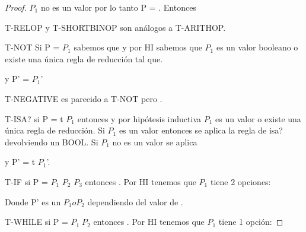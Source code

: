 \begin{proof}
$P_{1}$ no es un valor por lo tanto P = . Entonces

 \fullarrow {}


T-RELOP y T-SHORTBINOP son análogos a T-ARITHOP.

T-NOT Si P =  $P_{1}$ sabemos que  y por HI
sabemos que $P_{1}$ es un valor booleano o existe una única regla de reducción tal que.

 \fullarrow {}

y P' =  $P_{1}$'

T-NEGATIVE es parecido a T-NOT pero .

T-ISA? si P =  t $P_{1}$ entonces 
y por hipótesis inductiva $P_{1}$ es un valor o existe una única regla de reducción.
Si $P_{1}$ es un valor entonces se aplica la regla de isa? devolviendo un BOOL.
Si $P_{1}$ no es un valor se aplica 

 \fullarrow {}

y P' =  t $P_{1}$'.

T-IF si P =  $P_{1}$  $P_{2}$  $P_{3}$ entonces .
Por HI tenemos que $P_{1}$ tiene 2 opciones:

 \fullarrow {}


 \fullarrow {}

Donde P' es un $P_{1} o P_{2}$ dependiendo del valor de . 

T-WHILE si P =  $P_{1} \; P_{2}$  entonces .
Por HI tenemos que $P_{1}$ tiene 1 opción:

 \fullarrow {}

\end{proof}


